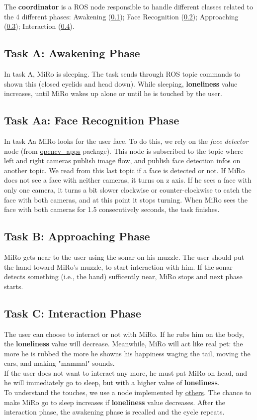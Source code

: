 \documentclass[12pt,peerreviewca, a4paper, onecolumn]{article}
\begin{document}
    \newpage
	\noindent The \textbf{coordinator} is a ROS node responsible to handle different classes related to the 4 different phases: Awakening (\ref{subsec:a}); Face Recognition (\ref{subsec:aa}); Approaching (\ref{subsec:b}); Interaction (\ref{subsec:c}).
	\subsection{Task A: Awakening Phase}
	\label{subsec:a}
	In task A, MiRo is sleeping. The task sends through ROS topic commands to shown this (closed eyelids and head down). While sleeping, \textbf{loneliness} value increases, until MiRo wakes up alone or until he is touched by the user.
	\subsection{Task Aa: Face Recognition Phase}	\label{subsec:aa}
	In task Aa MiRo looks for the user face. To do this, we rely on the \textit{face detector} node  (from \href{http://wiki.ros.org/opencv_apps}{opencv\_apps} package). This node is subscribed to the topic where left and right cameras publish image flow, and publish face detection infos on another topic. We read from this last topic if a face is detected or not.
	If MiRo does not see a face with neither cameras, it turns on z axis. If he sees a face with only one camera, it turns a bit slower clockwise or counter-clockwise to catch the face with both cameras, and at this point it stops turning. When MiRo sees the face with both cameras for 1.5 consecutively seconds, the task finishes.
	\subsection{Task B: Approaching Phase}	\label{subsec:b}
	MiRo gets near to the user using the sonar on his muzzle. The user should put the hand toward MiRo's muzzle, to start interaction with him. If the sonar detects something (i.e., the hand) sufficently near, MiRo stops and next phase starts.
	\subsection{Task C: Interaction Phase} 	\label{subsec:c} 
	The user can choose to interact or not with MiRo. If he rubs him on the body, the \textbf{loneliness} value will decrease. Meanwhile, MiRo will act like real pet: the more he is rubbed the more he showns his happiness waging the tail, moving the ears, and making "mammal" sounds.\\
	If the user does not want to interact any more, he must pat MiRo on head, and he will immediately go to sleep, but with a higher value of \textbf{loneliness}.\\
	To understand the touches, we use a node implemented by \href{https://github.com/EmaroLab/Miro_SocialRobot/blob/master/README.md}{others}.
	The chance to make MiRo go to sleep increases if \textbf{loneliness} value decreases. After the interaction phase, the awakening phase is recalled and the cycle repeats. 
	
\end{document}
